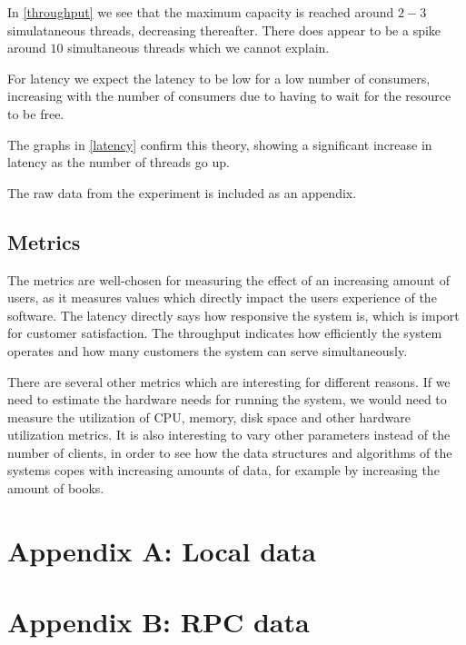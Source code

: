 \documentclass[11pt,a4paper]{article}
\begin{document}
In \autoref{throughput} we see that the maximum capacity is reached around
$2-3$ simulataneous threads, decreasing thereafter. There does appear to be a
spike around $10$ simultaneous threads which we cannot explain.

For latency we expect the latency to be low for a low number of
consumers, increasing with the number of consumers due to having to wait for
the resource to be free.

The graphs in \autoref{latency} confirm this theory, showing a significant
increase in latency as the number of threads go up.

The raw data from the experiment is included as an appendix.

\subsection{Metrics}
The metrics are well-chosen for measuring the effect of an increasing amount
of users, as it measures values which directly impact the users experience of
the software. The latency directly says how responsive the system is, which is
import for customer satisfaction. The throughput indicates how efficiently the
system operates and how many customers the system can serve simultaneously.

There are several other metrics which are interesting for different reasons.
If we need to estimate the hardware needs for running the system, we would
need to measure the utilization of CPU, memory, disk space and other hardware
utilization metrics. It is also interesting to vary other parameters instead of
the number of clients, in order to see how the data structures and algorithms
of the systems copes with increasing amounts of data, for example by increasing
the amount of books.


\appendix
\section*{Appendix A: Local data}
\label{a}

\section*{Appendix B: RPC data}
\label{b}

\end{document}
